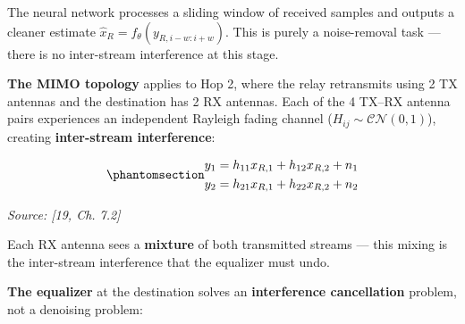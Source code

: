 The neural network processes a sliding window of received samples and outputs a cleaner estimate \(\hat{x}_R = f_\theta(y_{R,i-w:i+w})\). This is purely a noise-removal task --- there is no inter-stream interference at this stage.

\textbf{The MIMO topology} applies to Hop 2, where the relay retransmits using 2 TX antennas and the destination has 2 RX antennas. Each of the 4 TX--RX antenna pairs experiences an independent Rayleigh fading channel (\(H_{ij} \sim \mathcal{CN}(0,1)\)), creating \textbf{inter-stream interference}:

\begin{equation}\protect\phantomsection\label{eq:mimo-interference}{\begin{aligned}
y_1 &= h_{11} x_{R,1} + h_{12} x_{R,2} + n_1 \\
y_2 &= h_{21} x_{R,1} + h_{22} x_{R,2} + n_2
\end{aligned}
}\end{equation} \par{\small\textit{Source: [19, Ch. 7.2]}}

Each RX antenna sees a \textbf{mixture} of both transmitted streams --- this mixing is the inter-stream interference that the equalizer must undo.

\textbf{The equalizer} at the destination solves an \textbf{interference cancellation} problem, not a denoising problem:

